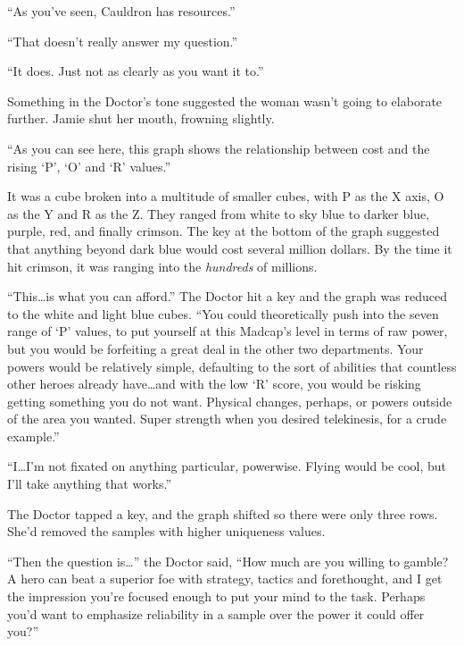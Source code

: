 ``As you've seen, Cauldron has resources.''



``That doesn't really answer my question.''



``It does.  Just not as clearly as you want it to.''



Something in the Doctor's tone suggested the woman wasn't going to elaborate further.  Jamie shut her mouth, frowning slightly.



``As you can see here, this graph shows the relationship between cost and the rising `P', `O' and `R' values.''



It was a cube broken into a multitude of smaller cubes, with P as the X axis, O as the Y and R as the Z.  They ranged from white to sky blue to darker blue, purple, red, and finally crimson.  The key at the bottom of the graph suggested that anything beyond dark blue would cost several million dollars.  By the time it hit crimson, it was ranging into the\emph{ hundreds} of millions.



``This\ldots is what you can afford.''  The Doctor hit a key and the graph was reduced to the white and light blue cubes.  ``You could theoretically push into the seven range of `P' values, to put yourself at this Madcap's level in terms of raw power, but you would be forfeiting a great deal in the other two departments.  Your powers would be relatively simple, defaulting to the sort of abilities that countless other heroes already have\ldots and with the low `R' score, you would be risking getting something you do not want.  Physical changes, perhaps, or powers outside of the area you wanted.  Super strength when you desired telekinesis, for a crude example.''



``I\ldots I'm not fixated on anything particular, powerwise.  Flying would be cool, but I'll take anything that works.''



The Doctor tapped a key, and the graph shifted so there were only three rows.  She'd removed the samples with higher uniqueness values.



``Then the question is\ldots'' the Doctor said, ``How much are you willing to gamble?  A hero can beat a superior foe with strategy, tactics and forethought, and I get the impression you're focused enough to put your mind to the task.  Perhaps you'd want to emphasize reliability in a sample over the power it could offer you?''



